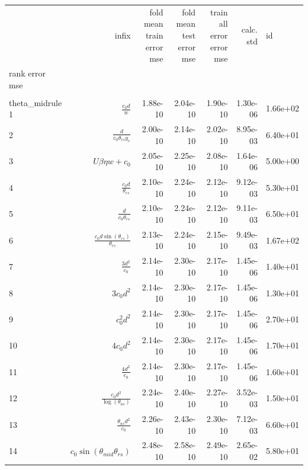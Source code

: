 \begin{tabularx}{\textwidth}{lRRRRRl}
\toprule
  &  infix  &  fold mean train error mse  &  fold mean test error mse  &  train all error error mse  &  calc. std  &  id  \\ 
rank error mse  &    &    &    &    &    &    \\ 
\\theta_{mid}rule
1  &  $ \displaystyle\frac{c_{0} d}{w} $  &  1.88e-10  &  2.04e-10  &  1.90e-10  &  1.30e-06  &  1.66e+02  \\ 
2  &  $ \displaystyle\frac{d}{c_{0} \theta_{rs} y_c} $  &  2.00e-10  &  2.14e-10  &  2.02e-10  &  8.95e-03  &  6.40e+01  \\ 
3  &  $ U \beta \eta w + c_{0} $  &  2.05e-10  &  2.25e-10  &  2.08e-10  &  1.64e-06  &  5.00e+00  \\ 
4  &  $ \displaystyle\frac{c_{0} d}{\theta_{rs}} $  &  2.10e-10  &  2.24e-10  &  2.12e-10  &  9.12e-03  &  5.30e+01  \\ 
5  &  $ \displaystyle\frac{d}{c_{0} \theta_{rs}} $  &  2.10e-10  &  2.24e-10  &  2.12e-10  &  9.11e-03  &  6.50e+01  \\ 
6  &  $ \displaystyle\frac{c_{0} d \sin{\left(\theta_{rs} \right)}}{\theta_{rs}} $  &  2.13e-10  &  2.24e-10  &  2.15e-10  &  9.49e-03  &  1.67e+02  \\ 
7  &  $ \displaystyle\frac{3 d^{2}}{c_{0}} $  &  2.14e-10  &  2.30e-10  &  2.17e-10  &  1.45e-06  &  1.40e+01  \\ 
8  &  $ 3 c_{0} d^{2} $  &  2.14e-10  &  2.30e-10  &  2.17e-10  &  1.45e-06  &  1.30e+01  \\ 
9  &  $ c_{0}^{2} d^{2} $  &  2.14e-10  &  2.30e-10  &  2.17e-10  &  1.45e-06  &  2.70e+01  \\ 
10  &  $ 4 c_{0} d^{2} $  &  2.14e-10  &  2.30e-10  &  2.17e-10  &  1.45e-06  &  1.70e+01  \\ 
11  &  $ \displaystyle\frac{4 d^{2}}{c_{0}} $  &  2.14e-10  &  2.30e-10  &  2.17e-10  &  1.45e-06  &  1.60e+01  \\ 
12  &  $ \displaystyle\frac{c_{0} d^{2}}{\log{\left(\theta_{as} \right)}} $  &  2.24e-10  &  2.40e-10  &  2.27e-10  &  3.52e-03  &  1.50e+01  \\ 
13  &  $ \displaystyle\frac{\theta_{as} d^{2}}{c_{0}} $  &  2.26e-10  &  2.43e-10  &  2.30e-10  &  7.12e-03  &  6.60e+01  \\ 
14  &  $ c_{0} \sin{\left(\theta_{mid} \theta_{rs} \right)} $  &  2.48e-10  &  2.58e-10  &  2.49e-10  &  2.65e-02  &  5.80e+01  \\ 

\end{tabularx}
